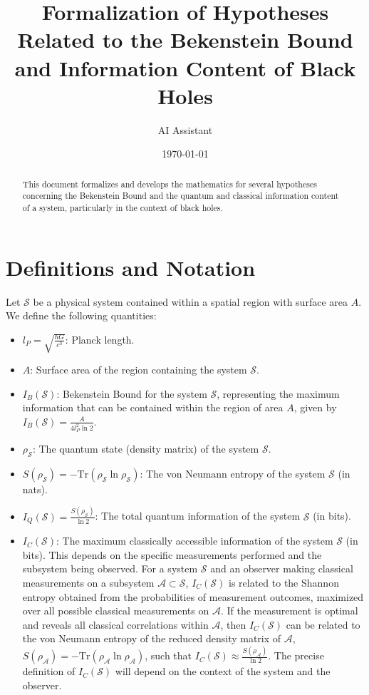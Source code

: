 \documentclass{article}
\title{Formalization of Hypotheses Related to the Bekenstein Bound and Information Content of Black Holes}
\author{AI Assistant}
\date{\today}
\begin{document}
	
	\maketitle
	
	\begin{abstract}
		This document formalizes and develops the mathematics for several hypotheses concerning the Bekenstein Bound and the quantum and classical information content of a system, particularly in the context of black holes.
	\end{abstract}
	
	\section{Definitions and Notation}
	
	Let $\mathcal{S}$ be a physical system contained within a spatial region with surface area $A$. We define the following quantities:
	\begin{itemize}
		\item $l_P = \sqrt{\frac{\hbar G}{c^3}}$: Planck length.
		\item $A$: Surface area of the region containing the system $\mathcal{S}$.
		\item $I_B(\mathcal{S})$: Bekenstein Bound for the system $\mathcal{S}$, representing the maximum information that can be contained within the region of area $A$, given by $I_B(\mathcal{S}) = \frac{A}{4 l_P^2 \ln 2}$.
		\item $\rho_{\mathcal{S}}$: The quantum state (density matrix) of the system $\mathcal{S}$.
		\item $S(\rho_{\mathcal{S}}) = -\text{Tr}(\rho_{\mathcal{S}} \ln \rho_{\mathcal{S}})$: The von Neumann entropy of the system $\mathcal{S}$ (in nats).
		\item $I_Q(\mathcal{S}) = \frac{S(\rho_{\mathcal{S}})}{\ln 2}$: The total quantum information of the system $\mathcal{S}$ (in bits).
		\item $I_C(\mathcal{S})$: The maximum classically accessible information of the system $\mathcal{S}$ (in bits). This depends on the specific measurements performed and the subsystem being observed. For a system $\mathcal{S}$ and an observer making classical measurements on a subsystem $\mathcal{A} \subset \mathcal{S}$, $I_C(\mathcal{S})$ is related to the Shannon entropy obtained from the probabilities of measurement outcomes, maximized over all possible classical measurements on $\mathcal{A}$. If the measurement is optimal and reveals all classical correlations within $\mathcal{A}$, then $I_C(\mathcal{S})$ can be related to the von Neumann entropy of the reduced density matrix of $\mathcal{A}$, $S(\rho_{\mathcal{A}}) = -\text{Tr}(\rho_{\mathcal{A}} \ln \rho_{\mathcal{A}})$, such that $I_C(\mathcal{S}) \approx \frac{S(\rho_{\mathcal{A}})}{\ln 2}$. The precise definition of $I_C(\mathcal{S})$ will depend on the context of the system and the observer.
	\end{itemize}
	
\end{document}
